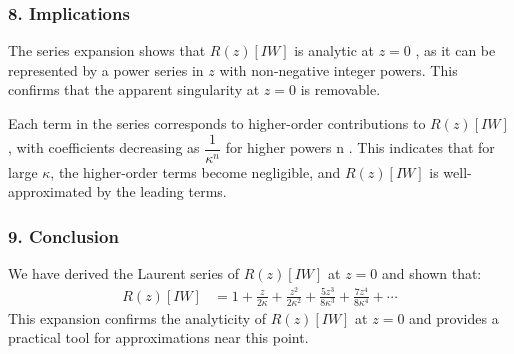 \subsubsection*{8. Implications}

The series expansion shows that  $R(z)[IW]$   is analytic at  $z=0$ , as it can be represented by a power series in  $z$  with non-negative integer powers. This confirms that the apparent singularity at $z=0$  is removable.

Each term in the series corresponds to higher-order contributions to  $R(z)[IW]$ ,
with coefficients decreasing as $\dfrac{1}{\kappa^n}$ for higher powers  n .
This indicates that for large  $\kappa$,
the higher-order terms become negligible, and  $R(z)[IW]$  is well-approximated by the leading terms.

\subsubsection*{9. Conclusion}

We have derived the Laurent series of  $R(z)[IW]$  at  $z=0$  and shown that:
\begin{align}
R(z)[IW] &= 1 + \frac{z}{2\kappa} + \frac{z^2}{2\kappa^2} + \frac{5z^3}{8\kappa^3} + \frac{7z^4}{8\kappa^4} + \cdots
\end{align}
This expansion confirms the analyticity of
$R(z)[IW]$  at $z=0$  and provides a practical tool for approximations  near this point.

